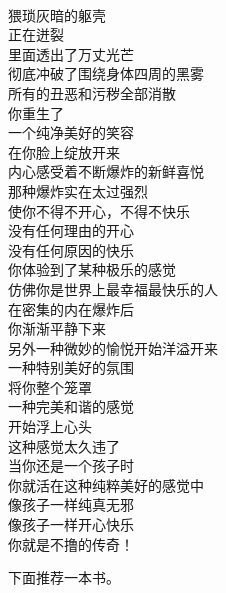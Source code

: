 \begin{poem}[不撸的传奇]
    \begin{multicols}{2}
        \centering~\\
        猥琐灰暗的躯壳 \\ 正在迸裂 \\ 里面透出了万丈光芒 \\ 彻底冲破了围绕身体四周的黑雾 \\ 所有的丑恶和污秽全部消散 \\ 你重生了 \\ 一个纯净美好的笑容 \\ 在你脸上绽放开来 \\ 内心感受着不断爆炸的新鲜喜悦 \\ 那种爆炸实在太过强烈 \\ 使你不得不开心，不得不快乐 \\ 没有任何理由的开心 \\ 没有任何原因的快乐 \\ 你体验到了某种极乐的感觉 \\ 仿佛你是世界上最幸福最快乐的人 \\ 在密集的内在爆炸后 \\ 你渐渐平静下来 \\ 另外一种微妙的愉悦开始洋溢开来 \\ 一种特别美好的氛围 \\ 将你整个笼罩 \\ 一种完美和谐的感觉 \\ 开始浮上心头 \\ 这种感觉太久违了 \\ 当你还是一个孩子时 \\ 你就活在这种纯粹美好的感觉中 \\ 像孩子一样纯真无邪 \\ 像孩子一样开心快乐 \\ 你就是不撸的传奇！
    \end{multicols}
\end{poem}

下面推荐一本书。

